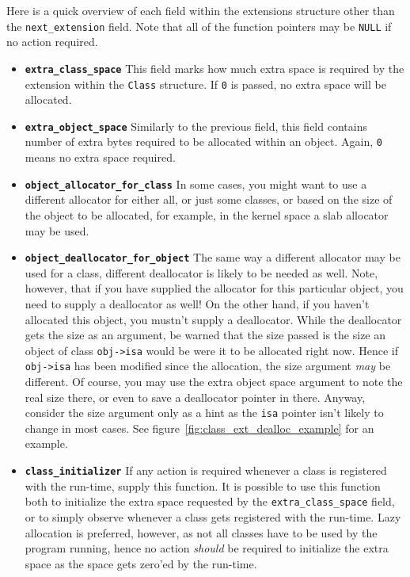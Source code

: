 Here is a quick overview of each field within the extensions structure other than the \verb=next_extension= field. Note that all of the function pointers may be \texttt{NULL} if no action required.

\begin{itemize}
  \item{\bf{\tt{extra\_class\_space}}} This field marks how much extra space is required by the extension within the \texttt{Class} structure. If \texttt{0} is passed, no extra space will be allocated.
  \item{\bf{\tt{extra\_object\_space}}} Similarly to the previous field, this field contains number of extra bytes required to be allocated within an object. Again, \texttt{0} means no extra space required.
  \item{\bf{\tt{object\_allocator\_for\_class}}} In some cases, you might want to use a different allocator for either all, or just some classes, or based on the size of the object to be allocated, for example, in the kernel space a slab allocator may be used.
  \item{\bf{\tt{object\_deallocator\_for\_object}}} The same way a different allocator may be used for a class, different deallocator is likely to be needed as well. Note, however, that if you have supplied the allocator for this particular object, you need to supply a deallocator as well! On the other hand, if you haven't allocated this object, you mustn't supply a deallocator.
  While the deallocator gets the size as an argument, be warned that the size passed is the size an object of class \verb=obj->isa= would be were it to be allocated right now. Hence if \verb=obj->isa= has been modified since the allocation, the size argument \emph{may} be different. Of course, you may use the extra object space argument to note the real size there, or even to save a deallocator pointer in there. Anyway, consider the size argument only as a hint as the \verb=isa= pointer isn't likely to change in most cases.
  See figure~\ref{fig:class_ext_dealloc_example} for an example.
  \item{\bf{\tt{class\_initializer}}} If any action is required whenever a class is registered with the run-time, supply this function. It is possible to use this function both to initialize the extra space requested by the \texttt{extra\_class\_space} field, or to simply observe whenever a class gets registered with the run-time. Lazy allocation is preferred, however, as not all classes have to be used by the program running, hence no action \emph{should} be required to initialize the extra space as the space gets zero'ed by the run-time.

\end{itemize}
